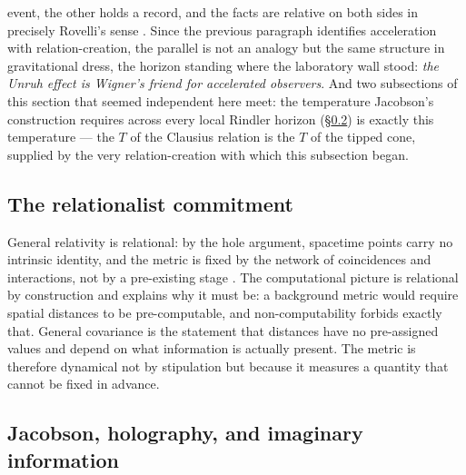 event, the other holds a record, and the facts are relative on both sides in precisely Rovelli's
sense \autocite{DiBiagioRovelli2021}. Since the previous paragraph identifies acceleration with
relation-creation, the parallel is not an analogy but the same structure in gravitational dress, the
horizon standing where the laboratory wall stood: \emph{the Unruh effect is Wigner's friend for
accelerated observers}. And two subsections of this section that seemed independent here meet: the
temperature Jacobson's construction requires across every local Rindler horizon
(\S\ref{sec:jacobson}) is exactly this temperature --- the $T$ of the Clausius relation is the $T$
of the tipped cone, supplied by the very relation-creation with which this subsection began.

\subsection{The relationalist commitment}
\label{sec:relationalism}

General relativity is relational: by the hole argument, spacetime points carry no
intrinsic identity, and the metric is fixed by the network of coincidences and
interactions, not by a pre-existing stage \autocite{Rovelli1996a}. The
computational picture is relational by construction and explains why it must be:
a background metric would require spatial distances to be pre-computable, and
non-computability forbids exactly that. General covariance is the statement that
distances have no pre-assigned values and depend on what information is actually
present. The metric is therefore dynamical not by stipulation but because it
measures a quantity that cannot be fixed in advance.

\subsection{Jacobson, holography, and imaginary information}
\label{sec:jacobson}

